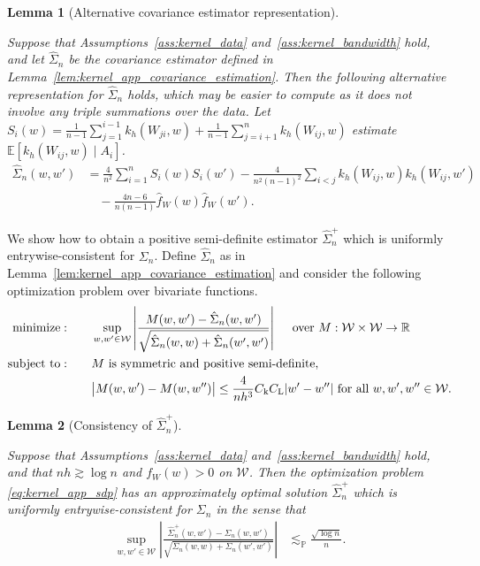 \documentclass[11pt,lof]{puthesis}
\renewcommand{\P}{\ensuremath{\mathbb{P}}}
\newcommand{\R}{\ensuremath{\mathbb{R}}}
\newcommand{\E}{\ensuremath{\mathbb{E}}}
\newcommand{\rL}{\ensuremath{\mathrm{L}}}
\newcommand{\rk}{\ensuremath{\mathrm{k}}}
\newcommand{\cW}{\ensuremath{\mathcal{W}}}
\DeclareMathOperator*{\minimize}{minimize:}
\DeclareMathOperator*{\subjectto}{subject\ to:}
\theoremstyle{break}
\newtheorem{lemma}{Lemma}[section]
\theoremstyle{proof}
\begin{document}
\begin{lemma}[Alternative covariance estimator representation]
  \label{lem:kernel_app_alternative_covariance_estimator}

  Suppose that Assumptions~\ref{ass:kernel_data}
  and~\ref{ass:kernel_bandwidth} hold,
  and let $\hat \Sigma_n$
  be the covariance estimator defined
  in Lemma~\ref{lem:kernel_app_covariance_estimation}.
  Then the following alternative representation
  for $\hat \Sigma_n$ holds,
  which may be easier to compute
  as it does not involve any triple summations
  over the data.
  Let $S_i(w) = \frac{1}{n-1}
  \sum_{j = 1}^{i-1} k_h(W_{j i}, w)
  + \frac{1}{n-1} \sum_{j = i+1}^n k_h(W_{i j}, w)$
  estimate $\E[k_h(W_{i j},w) \mid A_i]$.
  \begin{align*}
    \hat \Sigma_n(w,w')
    &=
    \frac{4}{n^2}
    \sum_{i=1}^n
    S_i(w) S_i(w')
    - \frac{4}{n^2(n-1)^2}
    \sum_{i<j}
    k_h(W_{i j},w)
    k_h(W_{i j},w') \\
    &\quad-
    \frac{4n-6}{n(n-1)}
    \hat f_W(w)
    \hat f_W(w').
  \end{align*}
\end{lemma}

We show how to obtain a positive semi-definite estimator $\hat \Sigma_n^+$
which is uniformly entrywise-consistent for $\Sigma_n$. Define $\hat \Sigma_n$
as in Lemma~\ref{lem:kernel_app_covariance_estimation} and consider the
following optimization problem over bivariate functions.
%
\begin{equation}
  \label{eq:kernel_app_sdp}
  \begin{aligned}
    \minimize
    \qquad
    & \sup_{w,w' \in \cW}
    \left|
    \frac{M(w,w') - \hat\Sigma_n(w,w')}
    {\sqrt{\hat \Sigma_n(w,w) + \hat \Sigma_n(w',w')}}
    \right|
    \quad \textup{ over } M: \cW \times \cW \to \R
    \\
    \subjectto
    \qquad
    & M \textup{ is symmetric and positive semi-definite}, \\
    & \big|M(w,w') - M(w, w'')\big|
    \leq \frac{4}{n h^3}
    C_\rk C_\rL
    |w'-w''|
    \textup{ for all }
    w, w', w'' \in \cW.
  \end{aligned}
\end{equation}

\begin{lemma}[Consistency of $\hat \Sigma_n^+$]
  \label{lem:kernel_app_sdp}

  Suppose that Assumptions~\ref{ass:kernel_data}
  and~\ref{ass:kernel_bandwidth} hold, and that
  $n h \gtrsim \log n$ and $f_W(w) > 0$ on $\cW$.
  Then the optimization problem \eqref{eq:kernel_app_sdp}
  has an approximately optimal solution $\hat\Sigma_n^+$
  which is uniformly entrywise-consistent
  for $\Sigma_n$ in the sense that
  \begin{align*}
    \sup_{w,w' \in \cW}
    \left|
    \frac{\hat \Sigma_n^+(w,w') - \Sigma_n(w,w')}
    {\sqrt{\Sigma_n(w,w) + \Sigma_n(w',w')}}
    \right|
    &\lesssim_\P
    \frac{\sqrt{\log n}}{n}.
  \end{align*}

\end{lemma}
\end{document}
